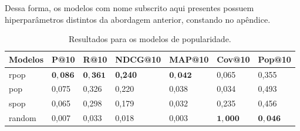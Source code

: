 Dessa forma, os modelos com nome subscrito aqui presentes possuem hiperparâmetros
distintos da abordagem anterior, constando no apêndice.

\begin{table}[htbp]
  \centering
  \begin{tabular}{|l|l|l|l|l|l|l|}
    \hline
    Modelos & P@10 & R@10 & NDCG@10 & MAP@10 & Cov@10 & Pop@10 \\
    \hline
    rpop & $\mathbf{0,086}$ & $\mathbf{0,361}$ & \textbf{0,240} & $\mathbf{0,042}$ & 0,065 & 0,355 \\
    \hline
    pop & 0,075 & 0,326 & 0,220 & 0,038 & 0,034 & 0,493 \\
    \hline
    spop & 0,065 & 0,298 & 0,179 & 0,032 & 0,235 & 0,456 \\
    \hline
    random & 0,007 & 0,033 & 0,018 & 0,003 & $\mathbf{1,000}$ & $\mathbf{0,046}$ \\
    \hline
  \end{tabular}
  \caption{Resultados para os modelos de popularidade.}
  \label{tab:model_metrics}
\end{table}


